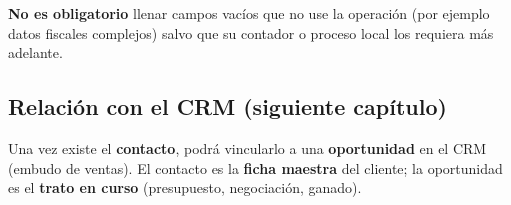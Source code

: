 \noindent\textbf{No es obligatorio} llenar campos vacíos que no use la operación (por ejemplo datos fiscales complejos) salvo que su contador o proceso local los requiera más adelante.

\subsection{Relación con el CRM (siguiente capítulo)}

Una vez existe el \textbf{contacto}, podrá vincularlo a una \textbf{oportunidad} en el CRM (embudo de ventas). El contacto es la \textbf{ficha maestra} del cliente; la oportunidad es el \textbf{trato en curso} (presupuesto, negociación, ganado).
